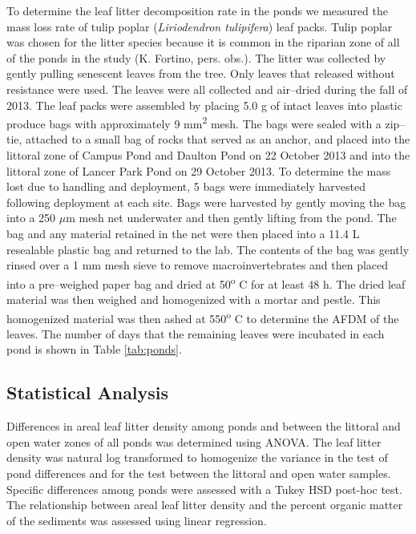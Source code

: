 \documentclass[12pt,letter]{article}
\begin{document}
To determine the leaf litter decomposition rate in the ponds we measured the mass loss rate of tulip poplar (\emph{Liriodendron tulipifera}) leaf packs. Tulip poplar was chosen for the litter species because it is common in the riparian zone of all of the ponds in the study (K. Fortino, pers. obs.).  The litter was collected by gently pulling senescent leaves from the tree. Only leaves that released without resistance were used.  The leaves were all collected and air--dried during the fall of 2013.  The leaf packs were assembled by placing 5.0 g of intact leaves into plastic produce bags with approximately 9 mm\textsuperscript{2} mesh. The bags were sealed with a zip--tie, attached to a small bag of rocks that served as an anchor, and placed into the littoral zone of Campus Pond and Daulton Pond on 22 October 2013 and into the littoral zone of Lancer Park Pond on 29 October 2013. To determine the mass lost due to handling and deployment, 5 bags were immediately harvested following deployment at each site. Bags were harvested by gently moving the bag into a 250 $\mu$m mesh net underwater and then gently lifting from the pond. The bag and any material retained in the net were then placed into a 11.4 L resealable plastic bag and returned to the lab.  The contents of the bag was gently rinsed over a 1 mm mesh sieve to remove macroinvertebrates and then placed into a pre--weighed paper bag and dried at 50\textsuperscript{o} C for at least 48 h.  The dried leaf material was then weighed and homogenized with a mortar and pestle. This homogenized material was then ashed at 550\textsuperscript{o} C to determine the AFDM of the leaves. The number of days that the remaining leaves were incubated in each pond is shown in Table \ref{tab:ponds}. 

\subsection{Statistical Analysis}

Differences in areal leaf litter density among ponds and between the littoral and open water zones of all ponds was determined using ANOVA. The leaf litter density was natural log transformed to homogenize the variance in the test of pond differences and for the test between the littoral and open water samples. Specific differences among ponds were assessed with a Tukey HSD post-hoc test. The relationship between areal leaf litter density and the percent organic matter of the sediments was assessed using linear regression.
\end{document}
